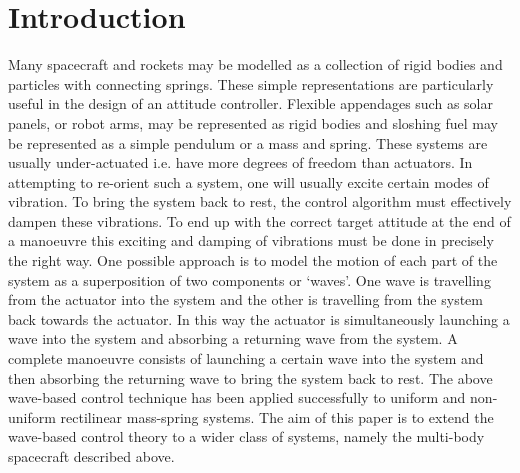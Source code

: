 \documentclass{mbd_fullpaper}
\begin{document}
\section{Introduction}
Many spacecraft and rockets may be modelled as a collection of rigid bodies and particles with connecting springs.
These simple representations are particularly useful in the design of an attitude controller.
Flexible appendages such as solar panels, or robot arms, may be represented as rigid bodies and sloshing fuel may be represented as a simple pendulum or a mass and spring.
These systems are usually under-actuated i.e. have more degrees of freedom than actuators.
In attempting to re-orient such a system, one will usually excite certain modes of vibration.
To bring the system back to rest, the control algorithm must effectively dampen these vibrations.
To end up with the correct target attitude at the end of a manoeuvre this exciting and damping of vibrations must be done in precisely the right way.
One possible approach is to model the motion of each part of the system as a superposition of two components or `waves'.
One wave is travelling from the actuator into the system and the other is travelling from the system back towards the actuator.
In this way the actuator is simultaneously launching a wave into the system and absorbing a returning wave from the system.
A complete manoeuvre consists of launching a certain wave into the system and then absorbing the returning wave to bring the system back to rest.
The above wave-based control technique has been applied successfully to uniform and non-uniform rectilinear mass-spring systems.
The aim of this paper is to extend the wave-based control theory to a wider class of systems, namely the multi-body spacecraft described above. 
\end{document}
